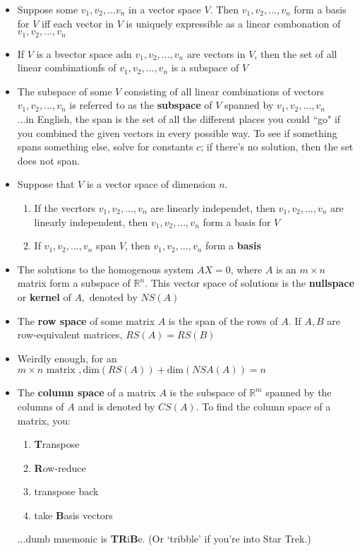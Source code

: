 \documentclass[10pt,letterpaper]{article}
\begin{document}
\begin{itemize}
\item Suppose some $v_1, v_2,...v_n$ in a vector space $V$. Then $v_1, v_2,...,v_n$ form a basis for $V$ iff each vector in $V$ is uniquely expressible as a linear combonation of $v_1,v_2,...,v_n$

\item If $V$ is a bvector space adn $v_1, v_2, ...,v_n$ are vectors in $V$, then the set of all linear combinationfs of $v_1, v_2,...,v_n$ is a subspace of $V$ 

\item The subspace of some $V$ consisting of all linear combinations of vectors $v_1, v_2,...,v_n$ is referred to as the \textbf{subspace} of $V$ spanned by $v_1, v_2,...,v_n$ \\
...in English, the span is the set of all the different places you could ``go" if you combined the given vectors in every possible way. To see if something spans something else, solve for constants $c$; if there's no solution, then the set does not span. 

\item Suppose that $V$ is a vector space of dimension $n$. 
\begin{enumerate}
\item If the vecrtors $v_1,v_2,...,v_n$ are linearly independet, then $v_1,v_2, ...,v_n$ are linearly independent, then $v_1,v_2, ...,v_n$  form a basis for $V$

\item If $v_1,v_2, ...,v_n$ span $V$, then $v_1,v_2, ...,v_n$ form a \textbf{basis}
\end{enumerate}

\item The solutions to the homogenous system $AX=0$, where $A$ is an $m\times n$ matrix form a subspace of $\mathbb{R}^n$. This vector space of solutions is the \textbf{nullspace} or \textbf{kernel}$\mbox{ of } A, \mbox{ denoted by } NS(A)$

\item The \textbf{row space} of some matrix $A$ is the span of the rows of $A$. If $A, B$ are row-equivalent matrices, $RS(A)=RS(B)$

\item Weirdly enough, for an $m\times n \mbox{ matrix },\mbox{dim}(RS(A))+\mbox{dim}(NSA(A))=n$

\item The \textbf{column space} of a matrix $A$ is the subspace of $\mathbb{R}^m$ spanned by the columns of $A$ and is denoted by $CS(A)$. To find the column space of a matrix, you: 
\begin{enumerate}
\item \textbf{T}ranspose 
\item \textbf{R}ow-reduce
\item transpose back 
\item take \textbf{B}asis vectors 
\end{enumerate}
...dumb mnemonic is \textbf{TR}i\textbf{B}e. (Or `tribble' if you're into Star Trek.) 


\end{itemize}
\end{document}
